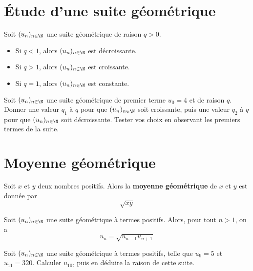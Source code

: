 \documentclass{article}
\begin{document}
\section{Étude d'une suite géométrique}
\begin{tcolorbox}
\begin{proposition}
Soit $(u_n)_{n \in \N}$ une suite géométrique de raison $q > 0$.
\begin{itemize}
\item Si $q < 1$, alors $(u_n)_{n \in \N}$ est décroissante. 
\item Si $q > 1$, alors $(u_n)_{n \in \N}$ est croissante. 
\item Si $q = 1$, alors $(u_n)_{n \in \N}$ est constante. 
\end{itemize}
\end{proposition}
\end{tcolorbox}
\begin{example}
Soit $(u_n)_{n \in \N}$ une suite géométrique de premier terme $u_0 = 4$ et de raison $q$. Donner une valeur $q_1$ à $q$ pour que $(u_n)_{n \in \N}$ soit croissante, puis une valeur $q_2$ à $q$ pour que $(u_n)_{n \in \N}$ soit décroissante. Tester vos choix en observant les premiers termes de la suite.
\vspace*{0.5cm}

\emptybox{4cm}
\end{example}
\section{Moyenne géométrique}
\begin{tcolorbox}
\begin{definition}
Soit $x$ et $y$ deux nombres positifs. Alors la \textbf{moyenne géométrique} de $x$ et $y$ est donnée par
\begin{equation*}
\sqrt{xy}
\end{equation*}        
\end{definition}
\end{tcolorbox}
\begin{proposition}
Soit $(u_n)_{n \in \N}$ une suite géométrique à termes positifs. Alors, pour tout $n > 1$, on a
\begin{equation*}
u_n = \sqrt{u_{n-1}u_{n+1}}
\end{equation*}
\end{proposition}
\begin{example}
Soit $(u_n)_{n \in \N}$ une suite géométrique à termes positifs, telle que $u_9 = 5$ et $u_11 = 320$. Calculer $u_10$, puis en déduire la raison de cette suite.

\emptybox{3cm}
\end{example}
\end{document}
